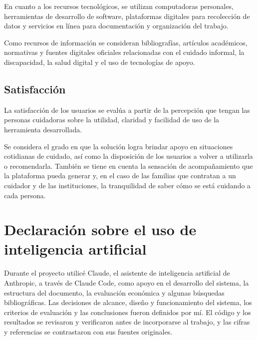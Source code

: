 En cuanto a los recursos tecnológicos, se utilizan computadoras personales, herramientas de desarrollo de software, plataformas digitales para recolección de datos y servicios en línea para documentación y organización del trabajo.

Como recursos de información se consideran bibliografías, artículos académicos, normativas y fuentes digitales oficiales relacionadas con el cuidado informal, la discapacidad, la salud digital y el uso de tecnologías de apoyo.

\subsection{Satisfacción}

La satisfacción de los usuarios se evalúa a partir de la percepción que tengan las personas cuidadoras sobre la utilidad, claridad y facilidad de uso de la herramienta desarrollada.

Se considera el grado en que la solución logra brindar apoyo en situaciones cotidianas de cuidado, así como la disposición de los usuarios a volver a utilizarla o recomendarla. También se tiene en cuenta la sensación de acompañamiento que la plataforma pueda generar y, en el caso de las familias que contratan a un cuidador y de las instituciones, la tranquilidad de saber cómo se está cuidando a cada persona.

\section{Declaración sobre el uso de inteligencia artificial}

Durante el proyecto utilicé Claude, el asistente de inteligencia artificial de Anthropic, a través de Claude Code, como apoyo en el desarrollo del sistema, la estructura del documento, la evaluación económica y algunas búsquedas bibliográficas. Las decisiones de alcance, diseño y funcionamiento del sistema, los criterios de evaluación y las conclusiones fueron definidos por mí. El código y los resultados se revisaron y verificaron antes de incorporarse al trabajo, y las cifras y referencias se contrastaron con sus fuentes originales.

